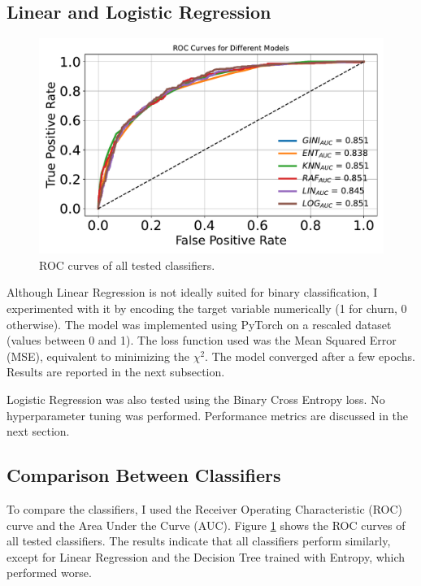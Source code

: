 \documentclass[a4paper,11pt]{article}
\begin{document}
\subsection{Linear and Logistic Regression}
\begin{figure}
\begin{center}    
\includegraphics[width=\linewidth]{figures/classification/roc_curves.pdf}
    \end{center}
\caption{ROC curves of all tested classifiers.}
\label{fig:roc}
\end{figure}
Although Linear Regression is not ideally suited for binary classification, I experimented with it by encoding the target variable numerically (1 for churn, 0 otherwise). The model was implemented using PyTorch on a rescaled dataset (values between 0 and 1). The loss function used was the Mean Squared Error (MSE), equivalent to minimizing the $\chi^2$. The model converged after a few epochs. Results are reported in the next subsection.

Logistic Regression was also tested using the Binary Cross Entropy loss. No hyperparameter tuning was performed. Performance metrics are discussed in the next section.

\subsection{Comparison Between Classifiers}

To compare the classifiers, I used the Receiver Operating Characteristic (ROC) curve and the Area Under the Curve (AUC). Figure \ref{fig:roc} shows the ROC curves of all tested classifiers. The results indicate that all classifiers perform similarly, except for Linear Regression and the Decision Tree trained with Entropy, which performed worse.
\end{document}
